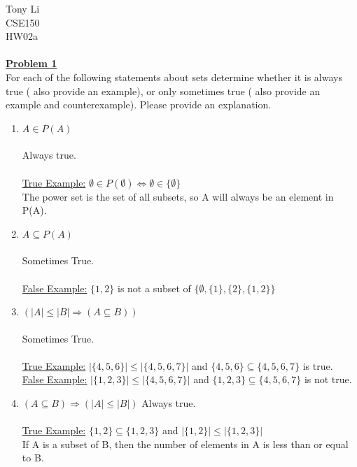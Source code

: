 \documentclass[11pt]{article}
\begin{document}
\noindent 
Tony Li \\
CSE150 \\
HW02a \\\\

	\noindent\textbf{\underline{Problem 1}}\\
	For each of the following statements about sets determine whether it is always true ( also provide 
	an example), or only sometimes true ( also provide an example and counterexample). Please 
	provide an explanation.

	\begin{enumerate}
		\item $A \in P(A)$ \\\\
			Always true. \\\\
				\underline{True Example:} $\emptyset \in P(\emptyset)  \Longleftrightarrow \emptyset \in \{\emptyset\} $ \\
				The power set is the set of all subsets, so A will always be an element in P(A).
				
		\item $A \subseteq P(A)$\\\\
			 Sometimes True. \\\\
				\underline{False Example:} $\{1,2\}$ is not a subset of $\{\emptyset , \{1\} , \{2\} , \{1, 2\}\}$       

		\item $(|A| \leq |B| \Rightarrow (A \subseteq B))$\\\\
			Sometimes True. \\\\
				\underline{True Example:} $|\{4, 5, 6\}| \leq |\{4, 5, 6, 7\}|$ and $\{4, 5, 6\} \subseteq \{4, 5, 6, 7\}$ is true.\\
				\underline{False Example:} $|\{1, 2, 3\}| \leq |\{4, 5, 6, 7\}|$ and $\{1, 2, 3\} \subseteq \{4, 5, 6, 7\}$ is not true.\\
		\item $( A \subseteq B ) \Rightarrow ( |A| \leq |B| )$	
			Always true. \\\\
				\underline{True Example:} $\{1, 2\} \subseteq \{1, 2, 3\}$ and $|\{1, 2\}| \leq |\{1, 2, 3\}|$ \\
				If A is a subset of B, then the number of elements in A is less than or equal to B. 
	\end{enumerate}
\end{document}
